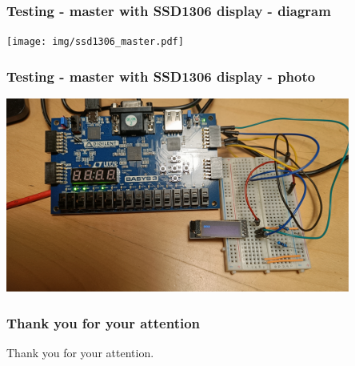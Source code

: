 \documentclass{beamer}
\begin{document}
\begin{frame}
  \frametitle{Testing - master with SSD1306 display - diagram}

  \begin{center}
    \texttt{[image: img/ssd1306\_master.pdf]}
  \end{center}
\end{frame}

\begin{frame}
  \frametitle{Testing - master with SSD1306 display - photo}

  \begin{center}
    \includegraphics[width=0.85\textwidth]{img/fpga-board-ssd1306.jpg}
  \end{center}
\end{frame}

\begin{frame}[plain]
    \frametitle{Thank you for your attention}
    Thank you for your attention.
\end{frame}

\appendix
\end{document}
